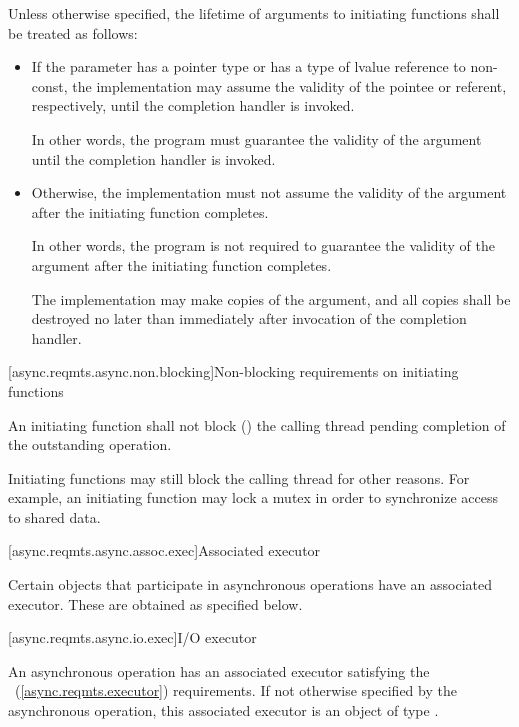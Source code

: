 \pnum
 Unless otherwise specified, the lifetime of arguments to initiating functions shall be treated as follows:

\begin{itemize}
\item
If the parameter has a pointer type or has a type of lvalue reference to non-const, the implementation may assume the validity of the pointee or referent, respectively, until the completion handler is invoked. \begin{note} In other words, the program must guarantee the validity of the argument until the completion handler is invoked. \end{note}

\item
Otherwise, the implementation must not assume the validity of the argument after the initiating function completes. \begin{note} In other words, the program is not required to guarantee the validity of the argument after the initiating function completes. \end{note} The implementation may make copies of the argument, and all copies shall be destroyed no later than immediately after invocation of the completion handler.
\end{itemize}



[async.reqmts.async.non.blocking]{Non-blocking requirements on initiating functions}

\pnum
 An initiating function shall not block () the calling thread pending completion of the outstanding operation.

\pnum
 \begin{note} Initiating functions may still block the calling thread for other reasons. For example, an initiating function may lock a mutex in order to synchronize access to shared data. \end{note}



[async.reqmts.async.assoc.exec]{Associated executor}

\pnum
Certain objects that participate in asynchronous operations have an associated executor. These are obtained as specified below.



[async.reqmts.async.io.exec]{I/O executor}

\pnum
An asynchronous operation has an associated executor satisfying the ~(\ref{async.reqmts.executor}) requirements. If not otherwise specified by the asynchronous operation, this associated executor is an object of type .

